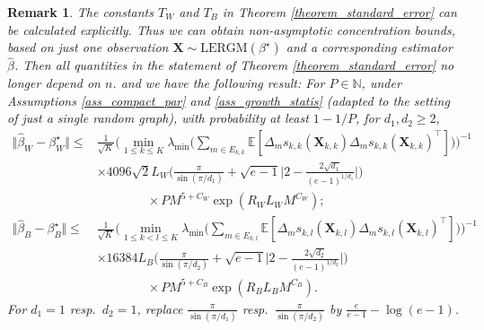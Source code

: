 \documentclass{article}
\newtheorem{Remark}[Theorem]{Remark}
\begin{document}
\begin{Remark} \label{remark_standard_error_nonasym}
    The constants $T_W$ and $T_B$ in Theorem \ref{theorem_standard_error} can be calculated explicitly. Thus we can obtain non-asymptotic concentration bounds, based on just one observation $\mathbf{X} \sim \mathrm{LERGM}(\beta^{\star})$ and a corresponding estimator $\hat{\beta}$. Then all quantities in the statement of Theorem \ref{theorem_standard_error} no longer depend on $n$.
    and we have the following result: For $P \in \mathbb{N}$, under Assumptions \ref{ass_compact_par} and \ref{ass_growth_statis} (adapted to the setting of just a single random graph), with probability at least $1-1/P$, 
    for $d_1, d_2 \geq 2,$
    \begin{align*}
        \Vert \hat{\beta}_W - \beta_W^{\star} \Vert \leq &  \frac{1}{\sqrt{K}} \bigg( \min_{1 \leq k \leq K} \lambda_\mathrm{min} \bigg( \sum_{m \in E_{k,k}} \mathbb{E}[\Delta_m s_{k,k}(\mathbf{X}_{k,k}) \Delta_m s_{k,k}(\mathbf{X}_{k,k})^{\top}] \bigg) \bigg)^{-1} \\
        & \times 4096 \sqrt{2} L_W \bigg( \frac{\pi}{\sin(\pi/d_1)} + \sqrt{e-1} \bigg\vert 2- \frac{2\sqrt{d_1}}{(e-1)^{1/d_1}} \bigg\vert \bigg) \\
        & \qquad \qquad \times 
        { P M^{5+C_W} \exp(R_W L_W M^{C_W} ) }; \\ 
        \Vert \hat{\beta}_B - \beta_B^{\star} \Vert \leq &  \frac{1}{\sqrt{K}} \bigg(  \min_{1 \leq k<l \leq K} \lambda_{\mathrm{min}} \bigg( \sum_{m \in E_{k,l}} \mathbb{E}[\Delta_m s_{k,l}(\mathbf{X}_{k,l}) \Delta_m s_{k,l}(\mathbf{X}_{k,l})^{\top}] \bigg) \bigg)^{-1} \\
        & \times 16384  L_B \bigg( \frac{\pi}{\sin(\pi/d_2)} + \sqrt{e-1} \bigg\vert 2- \frac{2\sqrt{d_2}}{(e-1)^{1/d_2}} \bigg\vert \bigg) \\
        & \qquad \qquad \times { P M^{5+C_B}\exp(R_B L_B M^{C_B} ) }.
    \end{align*}
    For $d_1=1$ resp.\ $d_2=1$, replace $\frac{\pi}{\sin(\pi/d_1)}$ resp.\ $\frac{\pi}{\sin(\pi/d_2)}$ by $\frac{e}{e-1}-\log(e-1)$.
\end{Remark}
\end{document}
